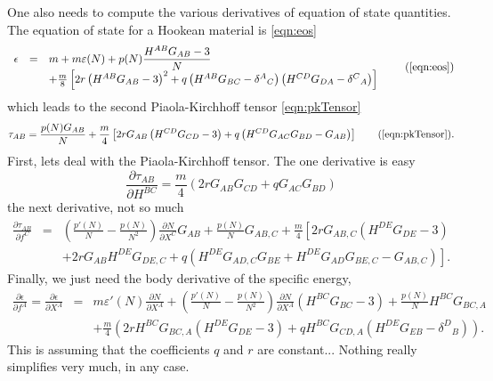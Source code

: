 One also needs to compute the various derivatives of equation of state
quantities. The equation of state for a Hookean material is
\eqref{eqn:eos}
\begin{equation}
\begin{array}{rcl}
\epsilon & = & \displaystyle{m + m\varepsilon(N) + p(N)\frac{H^{AB}G_{AB}-3}{N}} \\
 && + \frac{m}{8}\left[ 2r\left(H^{AB}G_{AB}-3\right)^2 + q\left(H^{AB}G_{BC} - \delta^{A}{}_C\right)\left(H^{CD}G_{DA} - \delta^{C}{}_A\right) \right]
 \end{array} \tag{\ref{eqn:eos}}
\end{equation}
which leads to the second Piaola-Kirchhoff tensor \eqref{eqn:pkTensor}
\begin{equation}
\tau_{AB} = \frac{p(N)G_{AB}}{N} +
\frac{m}{4}\left[2rG_{AB}\left(H^{CD}G_{CD}-3\right) +
q\left(H^{CD}G_{AC}G_{BD} - G_{AB} \right) \right]
\tag{\ref{eqn:pkTensor}}.
\end{equation}
First, lets deal with the Piaola-Kirchhoff tensor. The one derivative is
easy
\begin{equation}
\frac{\partial \tau_{AB}}{\partial H^{BC}} = 
\frac{m}{4}\left(2rG_{AB} G_{CD} +
q G_{AC}G_{BD} \right)
\end{equation}
the next derivative, not so much
\begin{eqnarray}
\nonumber\frac{\partial \tau_{AB}}{\partial f^C} & = & \left( \frac{p'(N)}{N} -
\frac{p(N)}{N^2}\right)\frac{\partial N}{\partial X^C}G_{AB} +
\frac{p(N)}{N} G_{AB,C} +
\frac{m}{4}\left[2rG_{AB,C}\left(H^{DE}G_{DE}-3\right)\right. \\
&& \left. + 2rG_{AB}H^{DE}G_{DE,C} +
q\left(H^{DE}G_{AD,C}G_{BE} + H^{DE}G_{AD}G_{BE,C} - G_{AB,C} \right)
\right].
\end{eqnarray}
Finally, we just need the body derivative of the specific energy,
\begin{eqnarray}
\nonumber\frac{\partial \epsilon}{\partial f^A} = \frac{\partial \epsilon}{\partial X^A} & = &
m\varepsilon'(N)\frac{\partial N}{\partial X^A} + \left( \frac{p'(N)}{N} - \frac{p(N)}{N^2}\right)
\frac{\partial N}{\partial X^A}(H^{BC}G_{BC} - 3) +
\frac{p(N)}{N}H^{BC}G_{BC,A} \\
&& + \frac{m}{4}\left(2rH^{BC}G_{BC,A}(H^{DE}G_{DE}-3) +
qH^{BC}G_{CD,A}(H^{DE}G_{EB} - \delta^D{}_B)\right).
\end{eqnarray}
This is assuming that the coefficients $q$ and $r$ are constant...
Nothing really simplifies very much, in any case.